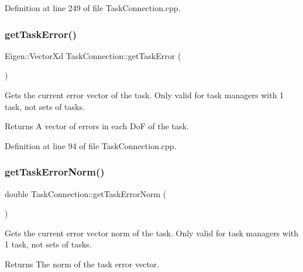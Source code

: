 Definition at line 249 of file Task\+Connection.\+cpp.

\hypertarget{classocra__recipes_1_1TaskConnection_ab968ad0f0a818f240eed58f1780f8586}{}\label{classocra__recipes_1_1TaskConnection_ab968ad0f0a818f240eed58f1780f8586} 
\subsubsection{\texorpdfstring{get\+Task\+Error()}{getTaskError()}}
{\footnotesize\ttfamily Eigen\+::\+Vector\+Xd Task\+Connection\+::get\+Task\+Error (\begin{DoxyParamCaption}{ }\end{DoxyParamCaption})}

Gets the current error vector of the task.  Only valid for task managers with 1 task, not sets of tasks.

\begin{DoxyReturn}{Returns}
A vector of errors in each DoF of the task. 
\end{DoxyReturn}


Definition at line 94 of file Task\+Connection.\+cpp.

\hypertarget{classocra__recipes_1_1TaskConnection_a2639764e4b7fe55aa29dce82a2268b3a}{}\label{classocra__recipes_1_1TaskConnection_a2639764e4b7fe55aa29dce82a2268b3a} 
\subsubsection{\texorpdfstring{get\+Task\+Error\+Norm()}{getTaskErrorNorm()}}
{\footnotesize\ttfamily double Task\+Connection\+::get\+Task\+Error\+Norm (\begin{DoxyParamCaption}{ }\end{DoxyParamCaption})}

Gets the current error vector norm of the task.  Only valid for task managers with 1 task, not sets of tasks.

\begin{DoxyReturn}{Returns}
The norm of the task error vector. 
\end{DoxyReturn}


